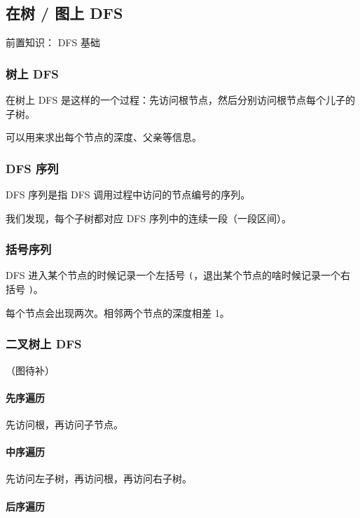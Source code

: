 
\subsection{在树 / 图上 DFS}

前置知识： DFS 基础 

\subsubsection{树上 DFS}

在树上 DFS 是这样的一个过程：先访问根节点，然后分别访问根节点每个儿子的子树。

可以用来求出每个节点的深度、父亲等信息。

\subsubsection{DFS 序列}

DFS 序列是指 DFS 调用过程中访问的节点编号的序列。

我们发现，每个子树都对应 DFS 序列中的连续一段（一段区间）。

\subsubsection{括号序列}

DFS 进入某个节点的时候记录一个左括号 \texttt{(}，退出某个节点的啥时候记录一个右括号 \texttt{)}。

每个节点会出现两次。相邻两个节点的深度相差 1。

\subsubsection{二叉树上 DFS}

（图待补）

\paragraph{先序遍历}

先访问根，再访问子节点。

\paragraph{中序遍历}

先访问左子树，再访问根，再访问右子树。

\paragraph{后序遍历}

